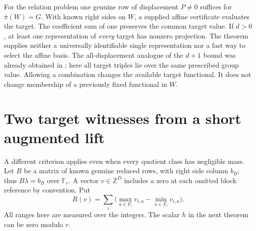 \documentclass[11pt]{article}
\newcommand{\Z}{\mathbb Z}
\newcommand{\F}{\mathbb F}
\begin{document}
For the relation problem one genuine row of displacement $P\ne0$ suffices for $\bar\pi(W)=G$. With known right sides on $W$, a supplied affine certificate evaluates the target. The coefficient sum of one preserves the common target value. If $d>0$, at least one representation of \emph{every} target has nonzero projection. The theorem supplies neither a universally identifiable single representation nor a fast way to select the affine basis. The all-displacement analogue of the $d+1$ bound was already obtained in \cite{prnine}; here all target triples lie over the same prescribed group value. Allowing a combination changes the available target functional. It does not change membership of a previously fixed functional in $W$.

\section{Two target witnesses from a short augmented lift}
A different criterion applies even when every quotient class has negligible mass. Let $B$ be a matrix of known genuine reduced rows, with right side column $b_B$; thus $B\lambda=b_B$ over $\F_r$. A vector $v\in\Z^D$ includes a zero at each omitted block reference by convention. Put
\[
 R(v)=\sum_i\big(\max_{a\in F_i}v_{i,a}-\min_{a\in F_i}v_{i,a}\big).
\]
All ranges here are measured over the integers. The scalar $h$ in the next theorem can be zero modulo $r$.
\end{document}

